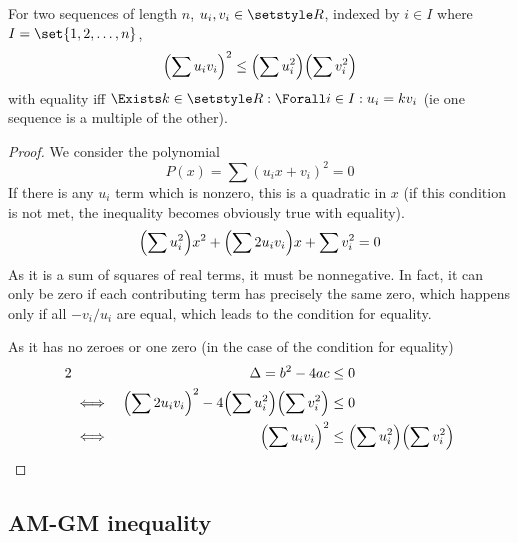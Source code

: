 \begin{theorem}
For two sequences of length \(n\), \(u_i, v_i \in \Reals\), indexed by
\(i \in I\) where \(I = \set{1, 2, \dotsc, n}\),
\begin{equation*}
\pqty{\sum u_i v_i}^2 \le \pqty{\sum u_i^2} \pqty{\sum v_i^2}
\end{equation*}
with equality iff \(\Exists k \in \Reals: \Forall i \in I: u_i = k v_i\) (ie one
sequence is a multiple of the other).
\end{theorem}
\begin{proof}
We consider the polynomial
\begin{equation*}
P(x) = \sum (u_i x + v_i)^2 = 0
\end{equation*}
If there is any \(u_i\) term which is nonzero, this is a quadratic in \(x\)
(if this condition is not met, the inequality becomes obviously true with
equality).
\begin{equation*}
\pqty{\sum u_i^2} x^2 + \pqty{\sum 2 u_i v_i} x + \sum v_i^2 = 0
\end{equation*}
As it is a sum of squares of real terms, it must be nonnegative. In fact, it
can only be zero if each contributing term has precisely the same zero,
which happens only if all \(-v_i/u_i\) are equal, which leads to the
condition for equality.

As it has no zeroes or one zero (in the case of the condition for equality)
\begin{alignat*}2
&&\Delta = b^2 - 4ac &\le 0 \\
&\iff&
\pqty{\sum 2 u_i v_i}^2 - 4\pqty{\sum u_i^2}\pqty{\sum v_i^2} &\le 0 \\
&\iff& \pqty{\sum u_i v_i}^2 &\le \pqty{\sum u_i^2} \pqty{\sum v_i^2}
    \qedhere
\end{alignat*}
\end{proof}

\subsection{AM-GM inequality}

